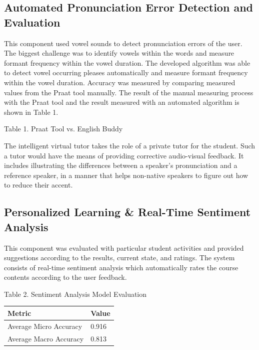 \documentclass[conference]{IEEEtran}
\begin{document}
\subsection{Automated Pronunciation Error Detection and Evaluation}

This component used vowel sounds to detect pronunciation errors of the user. The biggest challenge was to identify vowels within the words and measure formant frequency within the vowel duration. The developed algorithm was able to detect vowel occurring pleases automatically and measure formant frequency within the vowel duration. Accuracy was measured by comparing measured values from the Praat tool manually. The result of the manual measuring process with the Praat tool and the result measured with an automated algorithm is shown in Table 1.

\begin{table}[htbp]
\centering
\scriptsize
Table 1. Praat Tool vs. English Buddy
\linebreak
\linebreak
\centerline{}
\end{table}

The intelligent virtual tutor takes the role of a private tutor for the student. Such a tutor would have the means of providing corrective audio-visual feedback. It includes illustrating the differences between a speaker’s pronunciation and a reference speaker, in a manner that helps non-native speakers to figure out how to reduce their accent.

\subsection{Personalized Learning \& Real-Time Sentiment Analysis}
 
This component was evaluated with particular student activities and provided suggestions according to the results, current state, and ratings. The system consists of real-time sentiment analysis which automatically rates the course contents according to the user feedback.

\begin{center}
\scriptsize
Table 2. Sentiment Analysis Model Evaluation
\linebreak
\linebreak
\scriptsize
\begin{tabular}{ | m{13em} | m{3em} | }
\hline
\raggedright
Metric & Value \\
\hline
\raggedright
Average Micro Accuracy & 0.916 \\
\hline
\raggedright
Average Macro Accuracy & 0.813 \\
\hline
\end{tabular}
\linebreak
\end{center}
\end{document}
